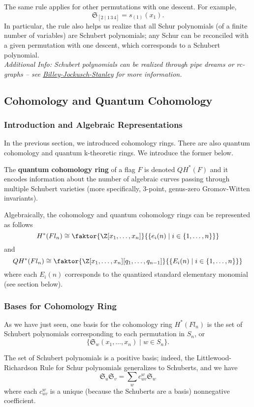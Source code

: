 \documentclass[11pt]{article}
\begin{document}
The same rule applies for other permutations with one descent. For example, 
\[
    \mathfrak{S}_{[2 \mid 1\,3\,4]} = s_{(1)}(x_1).
\]
In particular, the rule also helps us realize that all Schur polynomials (of a finite number of variables) are Schubert polynomials; any Schur can be reconciled with a given permutation with one descent, which corresponds to a Schubert polynomial. \\

\textit{Additional Info: Schubert polynomials can be realized through pipe dreams or rc-graphs -- see \href{https://sites.math.washington.edu/~billey/papers/bjs.pdf}{Billey-Jockusch-Stanley} for more information.}

\subsection{Cohomology and Quantum Cohomology}
\subsubsection{Introduction and Algebraic Representations}
In the previous section, we introduced cohomology rings. There are also quantum cohomology and quantum k-theoretic rings. We introduce the former below.
\begin{definition}
The \textbf{quantum cohomology ring} of a flag $F$ is denoted $QH^*(F)$ and it encodes information about the number of algebraic curves passing through multiple Schubert varieties (more specifically, 3-point, genus-zero Gromov-Witten invariants).
\end{definition}
Algebraically, the cohomology and quantum cohomology rings can be represented as follows
\[
    H^*(Fl_n) \cong \faktor{\Z[x_1, \dots, x_n]}{\{ e_i(n) \mid i \in \{1, \dots, n \}\}}
\]
and 
\[
    QH^*(Fl_n) \cong \faktor{\Z[x_1, \dots, x_n][q_1, \dots, q_{n-1}]}{\{ E_i(n) \mid i \in \{1, \dots, n \}\}}
\]
where each $E_i(n)$ corresponds to the quantized standard elementary monomial (see section below).

\subsubsection{Bases for Cohomology Ring}
As we have just seen, one basis for the cohomology ring $H^*(Fl_n)$ is the set of Schubert polynomials corresponding to each permutation in $S_n$, or
\[
    \{ \mathfrak{S}_w(x_1, \dots, x_n) \mid w \in S_n \}.
\]

The set of Schubert polynomials is a positive basis; indeed, the Littlewood-Richardson Rule for Schur polynomials generalizes to Schuberts, and we have
\[
    \mathfrak{S}_u \mathfrak{S}_v = \sum_{w} c_{uv}^w \mathfrak{S}_w
\]
where each $c_{uv}^w$ is a unique (because the Schuberts are a basis) nonnegative coefficient. \\
\end{document}

